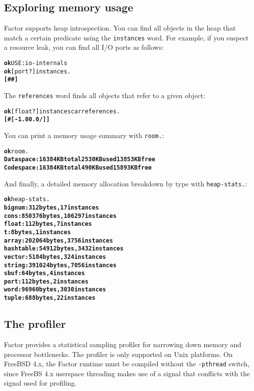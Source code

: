 \documentclass{report}
\begin{document}
\subsection{Exploring memory usage}

Factor supports heap introspection. You can find all objects in the heap that match a certain predicate using the \texttt{instances} word. For example, if you suspect a resource leak, you can find all I/O ports as follows:

\begin{alltt}
\textbf{ok} USE: io-internals
\textbf{ok} [ port? ] instances .
\textbf{[ \#<port @ 805466443> \#<port @ 805466499> ]}
\end{alltt}

The \texttt{references} word finds all objects that refer to a given object:

\begin{alltt}
\textbf{ok} [ float? ] instances car references .
\textbf{[ \#<array @ 805542171> [ -1.0 0.0 / ] ]}
\end{alltt}

You can print a memory usage summary with \texttt{room.}:

\begin{alltt}
\textbf{ok} room.
\textbf{Data space: 16384 KB total 2530 KB used 13853 KB free
Code space: 16384 KB total 490 KB used 15893 KB free}
\end{alltt}

And finally, a detailed memory allocation breakdown by type with \texttt{heap-stats.}:

\begin{alltt}
\textbf{ok} heap-stats.
\textbf{bignum: 312 bytes, 17 instances
cons: 850376 bytes, 106297 instances
float: 112 bytes, 7 instances
t: 8 bytes, 1 instances
array: 202064 bytes, 3756 instances
hashtable: 54912 bytes, 3432 instances
vector: 5184 bytes, 324 instances
string: 391024 bytes, 7056 instances
sbuf: 64 bytes, 4 instances
port: 112 bytes, 2 instances
word: 96960 bytes, 3030 instances
tuple: 688 bytes, 22 instances}
\end{alltt}

\subsection{The profiler}

Factor provides a statistical sampling profiler for narrowing down memory and processor bottlenecks.
The profiler is only supported on Unix platforms. On FreeBSD 4.x, the Factor runtime must
be compiled without the \texttt{-pthread} switch, since FreeBS 4.x userspace threading makes
use of a signal that conflicts with the signal used for profiling.
\end{document}
